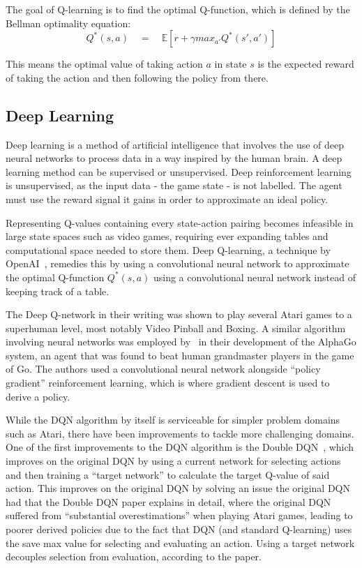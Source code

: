 \documentclass[12pt,a4paper]{article}
\begin{document}
    The goal of Q-learning is to find the optimal Q-function, which is defined by the Bellman optimality equation:
    \[Q^{*}(s, a) \quad = \quad \mathbb{E} [r + \gamma max_{a'} Q^{*}(s', a')]\]

    This means the optimal value of taking action \(a\) in state \(s\) is the expected reward of taking the action and then following the policy from there.

    \subsection{Deep Learning}\label{subsec:deep-learning}
    Deep learning is a method of artificial intelligence that involves the use of deep neural networks to process data in a way inspired by the human brain.
    A deep learning method can be supervised or unsupervised. %
    Deep reinforcement learning is unsupervised, as the input data - the game state - is not labelled.
    The agent must use the reward signal it gains in order to approximate an ideal policy.

    Representing Q-values containing every state-action pairing becomes infeasible in large state spaces such as video
    games, requiring ever expanding tables and computational space needed to store them.
    Deep Q-learning, a technique by OpenAI~\citep{mnih15}, remedies this by using a convolutional neural network to
    approximate the optimal Q-function \(Q^*(s, a)\) using a convolutional neural network instead of keeping track of
    a table.

    The Deep Q-network in their writing was shown to play several Atari games to a superhuman level, most notably Video Pinball and Boxing.
    A similar algorithm involving neural networks was employed by~\citet{silver16} in their development of the AlphaGo system, an agent that was found to beat human grandmaster players in the game of Go.
    The authors used a convolutional neural network alongside ``policy gradient'' reinforcement learning, which is where gradient descent is used to derive a policy.

    While the DQN algorithm by itself is serviceable for simpler problem domains such as Atari, there have been improvements to tackle more challenging domains.
    One of the first improvements to the DQN algorithm is the Double DQN~\citep{hasselt15}, which improves on the original DQN by using a current network for selecting actions
    and then training a ``target network'' to calculate the target Q-value of said action.
    This improves on the original DQN by solving an issue the original DQN had that the Double DQN paper explains in detail,
    where the original DQN suffered from ``substantial overestimations'' when playing Atari games, leading to poorer derived policies due to the fact that
    DQN (and standard Q-learning) uses the save max value for selecting and evaluating an action.
    Using a target network decouples selection from evaluation, according to the paper.
\end{document}
